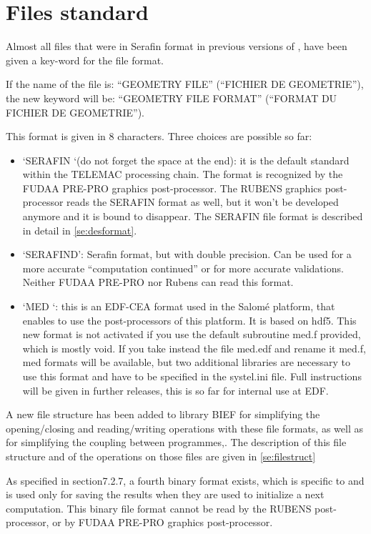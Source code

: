 \section{ Files standard}

Almost all files that were in Serafin format in previous versions of \tomawac, have
been given a key-word for the file format.

If the name of the file is: ``GEOMETRY FILE'' (``FICHIER DE GEOMETRIE''), the new
keyword will be: ``GEOMETRY FILE FORMAT'' (``FORMAT DU FICHIER DE GEOMETRIE'').

 This format is given in 8 characters. Three choices are possible so far:

\begin{itemize}
\item  `SERAFIN `(do not forget the space at the end): it is the default standard
  within the TELEMAC processing chain. The format is recognized by the FUDAA PRE-PRO
  graphics post-processor. The RUBENS graphics post-processor reads the SERAFIN format
  as well, but it won't be developed anymore and it is bound to disappear. The SERAFIN
  file format is described in detail in \ref{se:desformat}.

\item  `SERAFIND': Serafin format, but with double precision. Can be used for a more
  accurate ``computation continued'' or for more accurate validations. Neither FUDAA
  PRE-PRO nor Rubens can read this format.

\item  `MED  `: this is an EDF-CEA format used in the Salomé platform, that enables to
  use the post-processors of this platform. It is based on hdf5. This new format is not
  activated if you use the default subroutine med.f provided, which is mostly void. If
  you take instead the file med.edf and rename it med.f, med formats will be available,
  but two additional libraries are necessary to use this format and have to be specified
  in the systel.ini file. Full instructions will be given in further releases, this is
  so far for internal use at EDF.
\end{itemize}

A new file structure has been added to library BIEF for simplifying the opening/closing
and reading/writing operations with these file formats, as well as for simplifying the
coupling between programmes,. The description of this file structure and of the
operations on those files are given in \ref{se:filestruct}

As specified in section7.2.7, a fourth binary format exists, which is specific to
\tomawac and is used only for saving the results when they are used to initialize a
next computation. This binary file format cannot be read by the RUBENS post-processor,
or by FUDAA PRE-PRO graphics post-processor.


